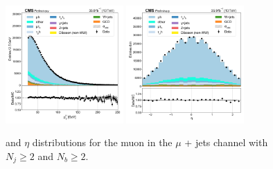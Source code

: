 \begin{figure}[htb!]
    \centering
    \includegraphics[width=0.4\textwidth]{chapters/Analysis/sectionPlots/figures/data_mc_overlays/mujet_2016_cat_gt4_gt2_signal_linear_lepton_lepton1_pt}
    \includegraphics[width=0.4\textwidth]{chapters/Analysis/sectionPlots/figures/data_mc_overlays/mujet_2016_cat_gt4_gt2_signal_linear_lepton_lepton1_eta}
    \caption{\pt and $\eta$ distributions for the muon in the $\mu$ + jets
    channel with $N_{j} \geq 2$ and $N_{b} \geq 2$.
    \label{fig:analysis:plots:mujet_2_kinematic}}
\end{figure}

